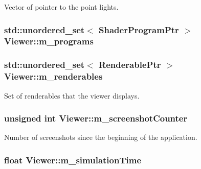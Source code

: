 Vector of pointer to the point lights. \hypertarget{classViewer_ae46d7bb320590c0fabe27e20299a4eec}{
\subsubsection[{m\+\_\+programs}]{\setlength{\rightskip}{0pt plus 5cm}std\+::unordered\+\_\+set$<$ {\bf Shader\+Program\+Ptr} $>$ Viewer\+::m\+\_\+programs\hspace{0.3cm}{\ttfamily [private]}}}\label{classViewer_ae46d7bb320590c0fabe27e20299a4eec}
\hypertarget{classViewer_a73ebb9719c2f2ffb9891642503c793cc}{
\subsubsection[{m\+\_\+renderables}]{\setlength{\rightskip}{0pt plus 5cm}std\+::unordered\+\_\+set$<$ {\bf Renderable\+Ptr} $>$ Viewer\+::m\+\_\+renderables\hspace{0.3cm}{\ttfamily [private]}}}\label{classViewer_a73ebb9719c2f2ffb9891642503c793cc}
Set of renderables that the viewer displays. \hypertarget{classViewer_a54b354f885ad35e9bf2d33e80ae32e8d}{
\subsubsection[{m\+\_\+screenshot\+Counter}]{\setlength{\rightskip}{0pt plus 5cm}unsigned int Viewer\+::m\+\_\+screenshot\+Counter\hspace{0.3cm}{\ttfamily [private]}}}\label{classViewer_a54b354f885ad35e9bf2d33e80ae32e8d}
Number of screenshots since the beginning of the application. \hypertarget{classViewer_a26701da64fd533bbadd7a20bb2bddb4b}{
\subsubsection[{m\+\_\+simulation\+Time}]{\setlength{\rightskip}{0pt plus 5cm}float Viewer\+::m\+\_\+simulation\+Time\hspace{0.3cm}{\ttfamily [private]}}}\label{classViewer_a26701da64fd533bbadd7a20bb2bddb4b}
